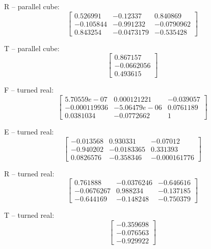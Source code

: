 \documentclass[10pt,a4paper]{article}
\begin{document}
R -- parallel cube: 
\begin{equation*}
\begin{bmatrix}
0.526991 & -0.12337 & 0.840869 \\ -0.105844 & -0.991232 & -0.0790962 \\ 0.843254 & -0.0473179 & -0.535428
\end{bmatrix}
\end{equation*}

T -- parallel cube: 
\begin{equation*}
\begin{bmatrix}
0.867157 \\ -0.0662056 \\ 0.493615
\end{bmatrix}
\end{equation*}

F -- turned real: 
\begin{equation*}
\begin{bmatrix}
5.70559e-07 & 0.000121221 & -0.039057 \\ -0.000119936 & -5.06479e-06 & 0.0761189 \\ 0.0381034 & -0.0772662 & 1
\end{bmatrix}
\end{equation*}

E -- turned real: 
\begin{equation*}
\begin{bmatrix}
-0.013568 & 0.930331 & -0.07012 \\ -0.940202 & -0.0183365 & 0.331393 \\ 0.0826576 & -0.358346 & -0.000161776
\end{bmatrix}
\end{equation*}

R -- turned real: 
\begin{equation*}
\begin{bmatrix}
0.761888 & -0.0376246 & -0.646616 \\ -0.0676267 & 0.988234 & -0.137185 \\ -0.644169 & -0.148248 & -0.750379
\end{bmatrix}
\end{equation*}

T -- turned real: 
\begin{equation*}
\begin{bmatrix}
-0.359698 \\ -0.076563 \\ -0.929922
\end{bmatrix}
\end{equation*}
\end{document}
